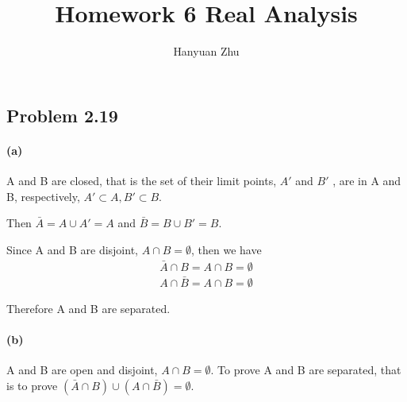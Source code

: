 \documentclass{article}
\title{Homework 6 Real Analysis}
\author{Hanyuan Zhu}
\begin{document}
\maketitle

\subsection*{Problem 2.19}
\paragraph{(a)}
A and B are closed, that is the set of their limit points, $A'$ and $B'$ , are in A and B, respectively,
$ A' \subset A, B' \subset B$.

Then $ \bar{A} = A \cup A' = A $ and $ \bar{B} = B \cup B' = B$.

Since A and B are disjoint, $A \cap B = \emptyset $, then we have
\begin{equation}
  \begin{split}
    \bar{A} \cap B = A \cap B = \emptyset \\
    A \cap \bar{B} = A \cap B = \emptyset
    \end{split}
\end{equation}

Therefore A and B are separated.

\paragraph{(b)}
A and B are open and disjoint, $ A \cap B = \emptyset$.
To prove A and B are separated, that is to prove $ (\bar{A} \cap B)  \cup  (A \cap \bar{B}) = \emptyset$.
\end{document}
